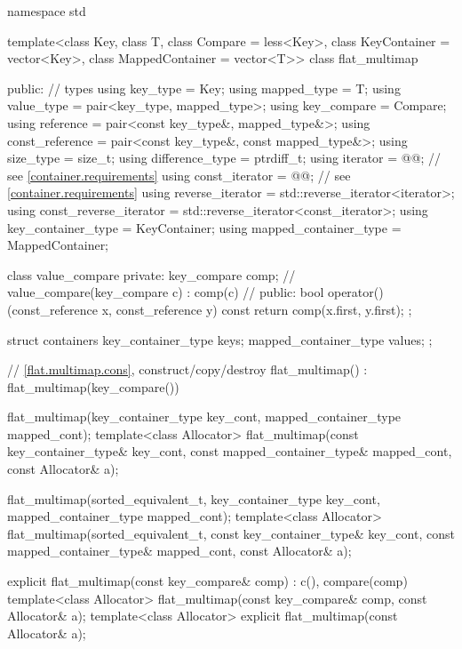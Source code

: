 \begin{codeblock}
namespace std {
  template<class Key, class T, class Compare = less<Key>,
           class KeyContainer = vector<Key>, class MappedContainer = vector<T>>
  class flat_multimap {
  public:
    // types
    using key_type               = Key;
    using mapped_type            = T;
    using value_type             = pair<key_type, mapped_type>;
    using key_compare            = Compare;
    using reference              = pair<const key_type&, mapped_type&>;
    using const_reference        = pair<const key_type&, const mapped_type&>;
    using size_type              = size_t;
    using difference_type        = ptrdiff_t;
    using iterator               = @@;     // see \ref{container.requirements}
    using const_iterator         = @@;     // see \ref{container.requirements}
    using reverse_iterator       = std::reverse_iterator<iterator>;
    using const_reverse_iterator = std::reverse_iterator<const_iterator>;
    using key_container_type     = KeyContainer;
    using mapped_container_type  = MappedContainer;

    class value_compare {
    private:
      key_compare comp;                                 // \expos
      value_compare(key_compare c) : comp(c) { }        // \expos
    public:
      bool operator()(const_reference x, const_reference y) const {
        return comp(x.first, y.first);
      }
    };

    struct containers {
      key_container_type keys;
      mapped_container_type values;
    };

    // \ref{flat.multimap.cons}, construct/copy/destroy
    flat_multimap() : flat_multimap(key_compare()) { }

    flat_multimap(key_container_type key_cont, mapped_container_type mapped_cont);
    template<class Allocator>
      flat_multimap(const key_container_type& key_cont, const mapped_container_type& mapped_cont,
                    const Allocator& a);

    flat_multimap(sorted_equivalent_t,
                  key_container_type key_cont, mapped_container_type mapped_cont);
    template<class Allocator>
      flat_multimap(sorted_equivalent_t, const key_container_type& key_cont,
                    const mapped_container_type& mapped_cont, const Allocator& a);

    explicit flat_multimap(const key_compare& comp)
      : c(), compare(comp) { }
    template<class Allocator>
      flat_multimap(const key_compare& comp, const Allocator& a);
    template<class Allocator>
      explicit flat_multimap(const Allocator& a);

}}
\end{codeblock}
